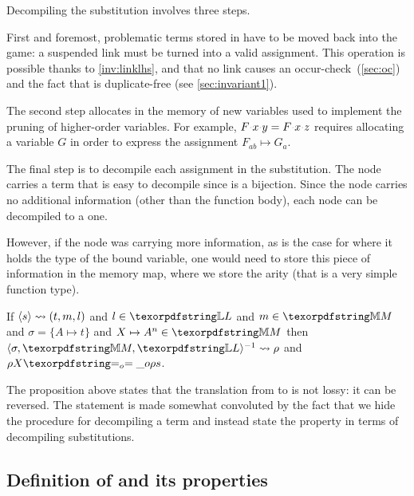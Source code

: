 Decompiling the substitution involves three steps.

First and foremost, problematic terms stored in
\linkStore have to be moved back into the game:
a suspended link must be turned into a valid assignment.
This operation is possible thanks to \cref{inv:linklhs},
and that no link causes an occur-check~(\cref{sec:oc})
and the fact that \linkStore is duplicate-free (see \cref{sec:invariant1}).

The second step allocates
in the memory of \Fo{}
new variables used to implement the pruning of higher-order variables. 
For example,
$F\appsep x\appsep y = F\appsep x\appsep z$ requires allocating a 
variable $G$ in order to express the assignment $F_{ab} \mapsto G_a$.

The final step is to decompile each assignment in the \Ho substitution. The 
node carries a term that is easy to decompile since \mapStore is a bijection.
Since the \olam node
carries no additional information (other than the function body),
each  node can be decompiled to a \olam one.

However, if the \olam node was carrying more information,
as is the case for \rocq where it holds the type of the bound variable,
one would need to store this piece of information in the memory map,
where we store the arity (that is a very simple function type).

\begin{proposition}\label{prop:comprt}
  If $\langle s \rangle\rightsquigarrow(t,m,l)$ and $l \in \linkStore$ and $m \in \mapStore$
  and
  $\sigma = \{ A \mapsto t\}$ and $\mapping{X}{A}{n} \in \mapStore$
  then $\D{\sigma}{\mapStore}{\linkStore}{\rho}$ and
  $\rho X \Eo \rho s$.
\end{proposition}

\noindent
The proposition above states that the translation from \Fo{} to \Ho{} is not
lossy: it can be reversed. The statement is made somewhat convoluted by the
fact that we hide the procedure for decompiling a term and instead state the
property in terms of decompiling substitutions.


\subsection{Definition of \Uo{} and its properties}\label{sec:founif}

